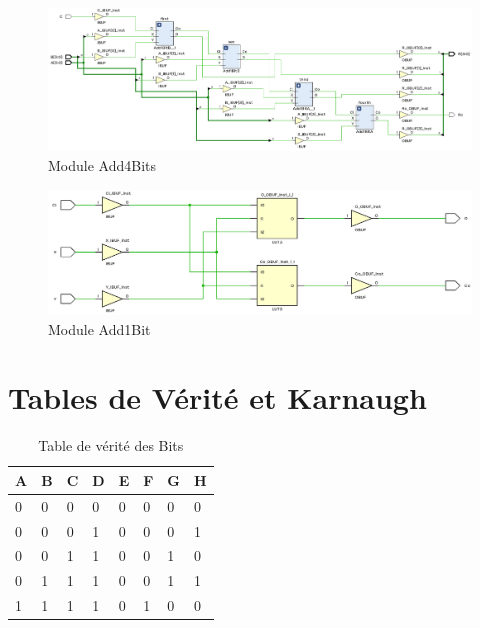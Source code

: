 \begin{figure}[H]
	\centering
	\includegraphics[width=.7\textwidth]{assets/img/schematic-add4bits.png}
	\caption{Module Add4Bits}
\end{figure}

\begin{figure}[H]
	\centering
	\includegraphics[width=.7\textwidth]{assets/img/schematic-add1bit.png}
	\caption{Module Add1Bit}
\end{figure}

\newpage
\section{Tables de Vérité et Karnaugh}



\begin{table}[H]
	\centering
	\caption{Table de vérité des Bits}
	\vspace{.2cm}
	\begin{tabular}{llllllll}
		\toprule
		A & B & C & D & E & F & G & H \\
		\midrule
		0 & 0 & 0 & 0 & 0 & 0 & 0 & 0 \\
		0 & 0 & 0 & 1 & 0 & 0 & 0 & 1 \\
		0 & 0 & 1 & 1 & 0 & 0 & 1 & 0 \\
		0 & 1 & 1 & 1 & 0 & 0 & 1 & 1 \\
		1 & 1 & 1 & 1 & 0 & 1 & 0 & 0 \\
		\bottomrule
	\end{tabular}

\end{table}

